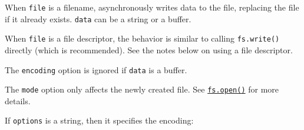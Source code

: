 When \texttt{file} is a filename, asynchronously writes data to the
file, replacing the file if it already exists. \texttt{data} can be a
string or a buffer.

When \texttt{file} is a file descriptor, the behavior is similar to
calling \texttt{fs.write()} directly (which is recommended). See the
notes below on using a file descriptor.

The \texttt{encoding} option is ignored if \texttt{data} is a buffer.

The \texttt{mode} option only affects the newly created file. See
\hyperref[fsopenpath-flags-mode-callback]{\texttt{fs.open()}} for more
details.

\begin{Shaded}
\begin{Highlighting}[]
 \OperatorTok{;}
\NormalTok{ \{ }\NormalTok{ \} } \OperatorTok{;}

\OperatorTok{=}  \NormalTok{(}\NormalTok{(}\NormalTok{))}\OperatorTok{;}
\NormalTok{(}\OperatorTok{,}\OperatorTok{,}\KeywordTok{=\textgreater{}}\NormalTok{ \{}
  \OperatorTok{;}
  \NormalTok{(}\NormalTok{)}\OperatorTok{;}
\NormalTok{\})}\OperatorTok{;}
\end{Highlighting}
\end{Shaded}

If \texttt{options} is a string, then it specifies the encoding:

\begin{Shaded}
\begin{Highlighting}[]
 \OperatorTok{;}

\NormalTok{(}\OperatorTok{,} \OperatorTok{,} \OperatorTok{,}\OperatorTok{;}
\end{Highlighting}
\end{Shaded}


